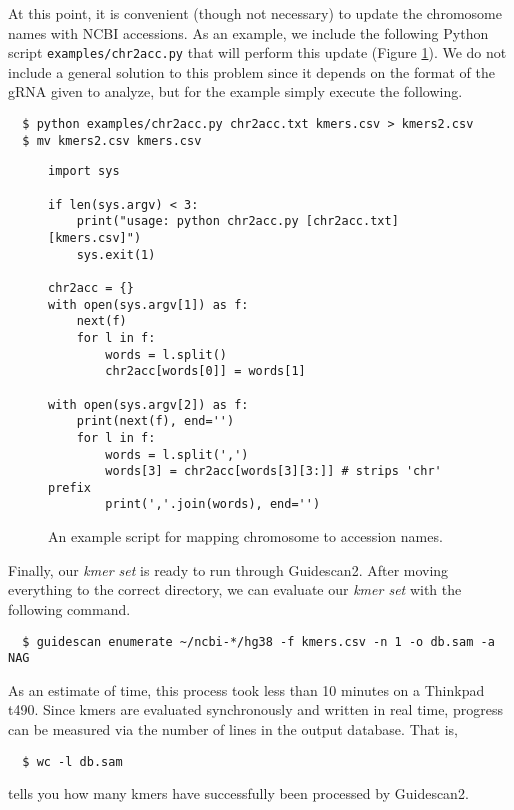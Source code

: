 \documentclass[11pt]{article}
\begin{document}
At this point, it is convenient (though not necessary) to update the
chromosome names with NCBI accessions. As an example, we include the
following Python script \texttt{examples/chr2acc.py} that will perform
this update (Figure \ref{fig:chr2accpy}). We do not include a general
solution to this problem since it depends on the format of the gRNA
given to analyze, but for the example simply execute the following.

\begin{verbatim}
  $ python examples/chr2acc.py chr2acc.txt kmers.csv > kmers2.csv
  $ mv kmers2.csv kmers.csv
\end{verbatim}

\begin{figure}[ht]
  \centering
  \begin{verbatim}
import sys

if len(sys.argv) < 3:
    print("usage: python chr2acc.py [chr2acc.txt] [kmers.csv]")
    sys.exit(1)

chr2acc = {}
with open(sys.argv[1]) as f:
    next(f)
    for l in f:
        words = l.split() 
        chr2acc[words[0]] = words[1]

with open(sys.argv[2]) as f:
    print(next(f), end='')
    for l in f:
        words = l.split(',')
        words[3] = chr2acc[words[3][3:]] # strips 'chr' prefix
        print(','.join(words), end='')
  \end{verbatim}
  \caption{\label{fig:chr2accpy} An example script for mapping
    chromosome to accession names.}
\end{figure}

Finally, our {\it kmer set} is ready to run through Guidescan2. After
moving everything to the correct directory, we can evaluate our {\it
  kmer set} with the following command.  \vspace{-0.8em}
\begin{verbatim}
  $ guidescan enumerate ~/ncbi-*/hg38 -f kmers.csv -n 1 -o db.sam -a NAG
\end{verbatim}
As an estimate of time, this process took less than 10 minutes on a
Thinkpad t490. Since kmers are evaluated synchronously and written in
real time, progress can be measured via the number of lines in the
output database. That is,
\vspace{-0.8em}
\begin{verbatim}
  $ wc -l db.sam
\end{verbatim}
tells you how many kmers have successfully been processed by Guidescan2.
\end{document}
